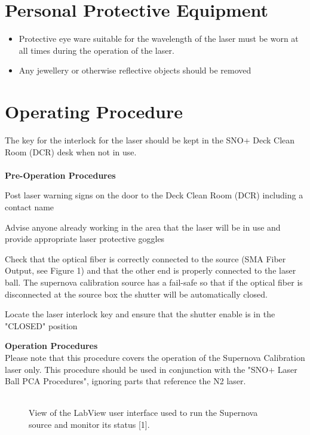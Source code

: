 \section{Personal Protective Equipment}
\begin{itemize}
\item Protective eye ware suitable for the wavelength of the laser must be worn at all times during the operation of the laser. 
\item Any jewellery or otherwise reflective objects should be removed 
\end{itemize}
\section{Operating Procedure}
The key for the interlock for the laser should be kept in the SNO+ Deck Clean Room (DCR) desk when not in use. \\ \\
\textbf{Pre-Operation Procedures}
\begin{enumerate}
\begin{checklist}
    \item Post laser warning signs on the door to the Deck Clean Room (DCR) including a contact name 
    \item Advise anyone already working in the area that the laser will be in use and provide appropriate laser protective goggles
    \item Check that the optical fiber is correctly connected to the source (SMA Fiber Output, see Figure 1) and that the other end is properly connected to the laser ball. The supernova calibration source has a fail-safe so that if the optical fiber is disconnected at the source box the shutter will be automatically closed. 
    \item Locate the laser interlock key and ensure that the shutter enable is in the "CLOSED" position 
\end{checklist}
\end{enumerate}
\textbf{Operation Procedures}\\
Please note that this procedure covers the operation of the Supernova Calibration laser only. This procedure should be used in conjunction with the "SNO+ Laser Ball PCA Procedures", ignoring parts that reference the N2 laser.\\ \\
\begin{figure}[h] 
\vspace{0.5cm}
{}
\captionsetup{justification=centering}
\caption{View of the LabView user interface used to run the Supernova source and monitor its status [1].} 
\end{figure}
